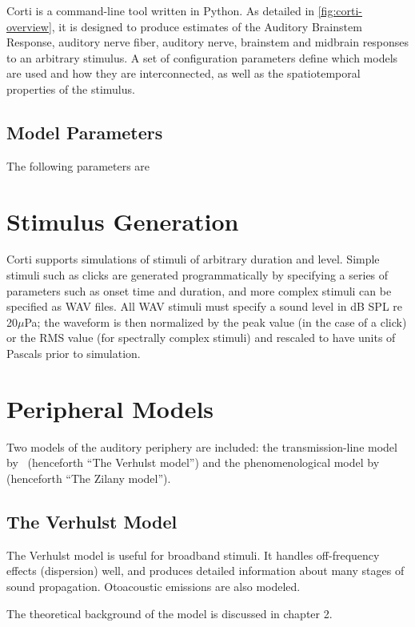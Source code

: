 Corti is a command-line tool written in Python. As detailed in \autoref{fig:corti-overview}, it is designed to produce estimates of the Auditory Brainstem Response, auditory nerve fiber, auditory nerve, brainstem and midbrain responses to an arbitrary stimulus.  A set of configuration parameters define which models are used and how they are interconnected, as well as the spatiotemporal properties of the stimulus.

\subsection{Model Parameters} %
\label{sub:model_parameters}
The following parameters are
\section{Stimulus Generation} %
\label{sec:stimulus_generation}
Corti supports simulations of stimuli of arbitrary duration and level.  Simple stimuli such as clicks are generated programmatically by specifying a series of parameters such as onset time and duration, and more complex stimuli can be specified as WAV files.  All WAV stimuli must specify a sound level in dB SPL re 20$\mu$Pa; the waveform is then normalized by the peak value (in the case of a click) or the RMS value (for spectrally complex stimuli) and rescaled to have units of Pascals prior to simulation.
\section{Peripheral Models} %
\label{sec:peripheral_models}
Two models of the auditory periphery are included: the transmission-line model by~\cite{Verhulst2015Functional} (henceforth ``The Verhulst model'') and the phenomenological model by~\cite{Zilany2014Updated} (henceforth ``The Zilany model'').

\subsection{The Verhulst Model} %
\label{sub:the_verhulst_model1}
The Verhulst model is useful for broadband stimuli.  It handles off-frequency effects (dispersion) well, and produces detailed information about many stages of sound propagation.  Otoacoustic emissions are also modeled. 

The theoretical background of the model is discussed in chapter 2.

